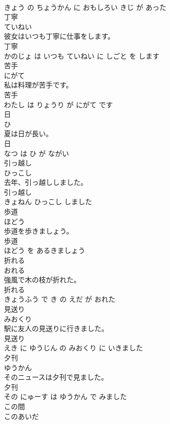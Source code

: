 \documentclass[8pt]{extreport}
\begin{document}
\begin{CJK}{UTF8}{min}
\\	きょう の ちょうかん に おもしろい きじ が あった			
\\	丁寧	
\\	ていねい			
\\	彼女はいつも丁寧に仕事をします。	
\\	丁寧 
\\	かのじょ は いつも ていねい に しごと を します			
\\	苦手	
\\	にがて			
\\	私は料理が苦手です。	
\\	苦手 
\\	わたし は りょうり が にがて です			
\\	日	
\\	ひ			
\\	夏は日が長い。	
\\	日 
\\	なつ は ひ が ながい			
\\	引っ越し	
\\	ひっこし			
\\	去年、引っ越ししました。	
\\	引っ越し 
\\	きょねん ひっこし しました			
\\	歩道	
\\	ほどう			
\\	歩道を歩きましょう。	
\\	歩道 
\\	ほどう を あるきましょう			
\\	折れる	
\\	おれる			
\\	強風で木の枝が折れた。	
\\	折れる 
\\	きょうふう で き の えだ が おれた			
\\	見送り	
\\	みおくり			
\\	駅に友人の見送りに行きました。	
\\	見送り 
\\	えき に ゆうじん の みおくり に いきました			
\\	夕刊	
\\	ゆうかん			
\\	そのニュースは夕刊で見ました。	
\\	夕刊 
\\	その にゅーす は ゆうかん で みました			
\\	この間	
\\	このあいだ			

\end{CJK}
\end{document}
